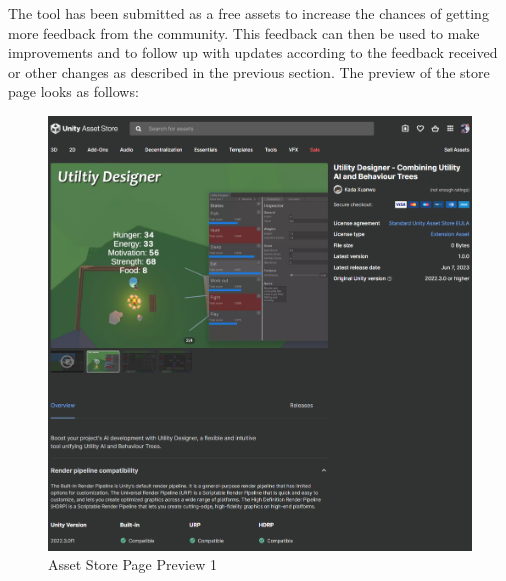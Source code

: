 The tool has been submitted as a free assets to increase the chances of getting more feedback from the community. This feedback can then be used to make improvements and to follow up with updates according to the feedback received or other changes as described in the previous section. The preview of the store page looks as follows:

\begin{figure}[H]
    \centering
    \begin{minipage}{0.49\textwidth}
        \centering
        \includegraphics[scale=0.26]{images/asset_store_page_1.png}
        \caption{Asset Store Page Preview 1}
        \label{fig:asset_store_page_1}
    \end{minipage}\hfill
    \begin{minipage}{0.49\textwidth}
        \centering

\end{minipage}
\end{figure}
